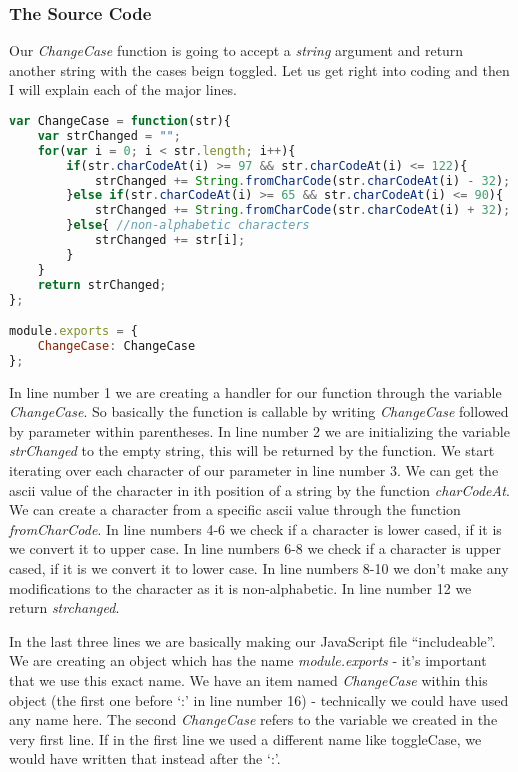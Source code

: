 \documentclass{article}
\begin{document}
\subsubsection{The Source Code}
Our \textit{ChangeCase} function is going to accept a \textit{string} argument and return another string with the cases beign toggled.
Let us get right into coding and then I will explain each of the major lines.
\begin{lstlisting}[language=JavaScript]
var ChangeCase = function(str){
	var strChanged = "";
	for(var i = 0; i < str.length; i++){
		if(str.charCodeAt(i) >= 97 && str.charCodeAt(i) <= 122){
			strChanged += String.fromCharCode(str.charCodeAt(i) - 32);
		}else if(str.charCodeAt(i) >= 65 && str.charCodeAt(i) <= 90){
			strChanged += String.fromCharCode(str.charCodeAt(i) + 32);
		}else{ //non-alphabetic characters
			strChanged += str[i];
		}
	}
	return strChanged;
};

module.exports = {
	ChangeCase: ChangeCase
};
\end{lstlisting}
In line number 1 we are creating a handler for our function through the variable \textit{ChangeCase}. So basically the function
is callable by writing \textit{ChangeCase} followed by parameter within parentheses.
In line number 2 we are initializing the variable \textit{strChanged} to the empty string, this will be returned by the function.
We start iterating over each character of our parameter in line number 3.
We can get the ascii value of the character in ith position of a string by the function \textit{charCodeAt}.
We can create a character from a specific ascii value through the function \textit{fromCharCode}.
In line numbers 4-6 we check if a character is lower cased, if it is we convert it to upper case.
In line numbers 6-8 we check if a character is upper cased, if it is we convert it to lower case.
In line numbers 8-10 we don't make any modifications to the character as it is non-alphabetic.
In line number 12 we return \textit{strchanged}.

In the last three lines we are basically making our JavaScript file ``includeable''. We are creating an object
which has the name \textit{module.exports} - it's important that we use this exact name.
We have an item named \textit{ChangeCase} within this object (the first one before `:' in line number 16) - technically
we could have used any name here. The second \textit{ChangeCase} refers to the variable we created in the very first line.
If in the first line we used a different name like toggleCase, we would have written that instead after the `:'.
\end{document}
